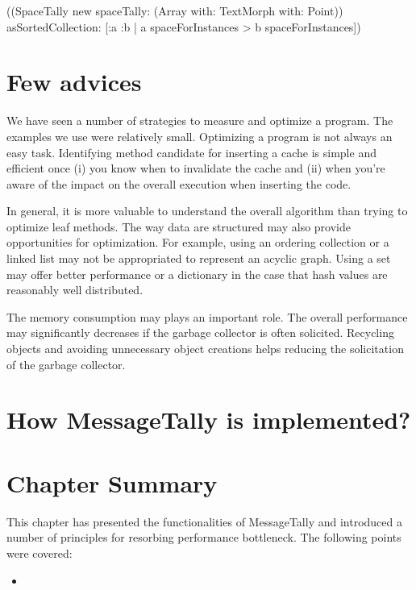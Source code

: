 \documentclass[a4paper,10pt,twoside]{book}
\begin{document}
\begin{code}{}
((SpaceTally new spaceTally: (Array with: TextMorph with: Point)) 
	asSortedCollection: [:a :b | a spaceForInstances > b spaceForInstances]) 
\end{code}



\section{Few advices}

We have seen a number of strategies to measure and optimize a program. The examples we use were relatively small. Optimizing a program is not always an easy task. Identifying method candidate for inserting a cache is simple and efficient once (i) you know when to invalidate the cache and (ii) when you're aware of the impact on the overall execution when inserting the code.

In general, it is more valuable to understand the overall algorithm than trying to optimize leaf methods. The way data are structured may also provide opportunities for optimization. For example, using an ordering collection or a linked list may not be appropriated to represent an acyclic graph. Using a set may offer better performance or a dictionary in the case that hash values are reasonably well distributed.

The memory consumption may plays an important role. The overall performance may significantly decreases if the garbage collector is often solicited. Recycling objects and avoiding unnecessary object creations helps reducing the solicitation of the garbage collector.

\section {How MessageTally is implemented?}

%
%

\section{Chapter Summary}

This chapter has presented the functionalities of MessageTally and introduced a number of principles for resorbing performance bottleneck. The following points were covered:

\begin{itemize}
\item 
\end{itemize}


\ifx\wholebook\relax\else
\end{document}
